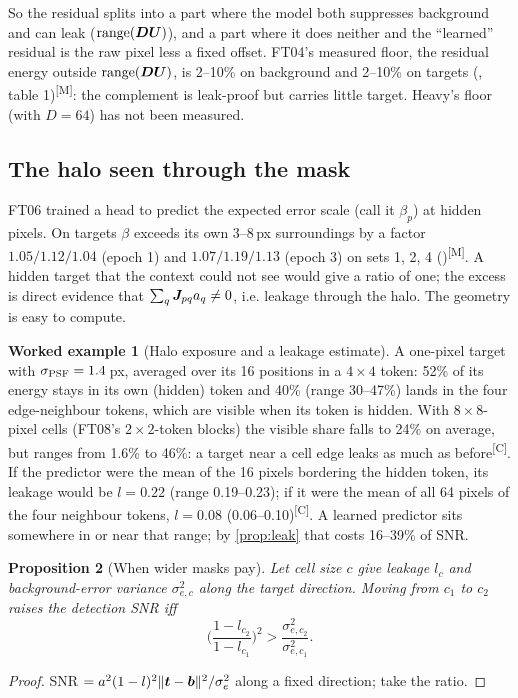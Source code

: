\documentclass[11pt,a4paper]{article}
\theoremstyle{plain}
\newtheorem{proposition}{Proposition}[section]
\theoremstyle{definition}
\newtheorem{example}[proposition]{Worked example}
\theoremstyle{remark}
\newcommand{\rng}{\operatorname{range}}
\newcommand{\bvec}{\B{b}}
\newcommand{\tv}{\B{t}}
\newcommand{\Um}{\B{U}}
\newcommand{\Dm}{\B{D}}
\newcommand{\nrm}[1]{\lVert #1\rVert}
\newcommand{\meas}{\textsuperscript{\textsf{\scriptsize[M]}}}
\newcommand{\comp}{\textsuperscript{\textsf{\scriptsize[C]}}}
\begin{document}
So the residual splits into a part where the model both suppresses background and can leak ($\rng(\Dm\Um)$), and a part
where it does neither and the ``learned'' residual is the raw pixel less a fixed offset. FT04's measured floor, the
residual energy outside $\rng(\Dm\Um)$, is 2--10\% on background and 2--10\% on targets
(, table 1)\meas: the complement is leak-proof but carries little target. Heavy's floor
(with $D=64$) has not been measured.

\subsection{The halo seen through the mask}

FT06 trained a head to predict the expected error scale (call it $\beta_p$) at hidden pixels. On targets $\beta$
exceeds its own 3--8\,px surroundings by a factor $1.05/1.12/1.04$ (epoch 1) and $1.07/1.19/1.13$ (epoch 3) on sets 1, 2, 4
()\meas. A hidden target that the context could not see would give a ratio of one; the
excess is direct evidence that $\sum_q\bm{J}_{pq}a_q\neq0$, i.e. leakage through the halo. The geometry is easy to compute.

\begin{example}[Halo exposure and a leakage estimate]
\label{ex:leak}
A one-pixel target with $\sigma_{\rm PSF}=1.4$\,px, averaged over its 16 positions in a $4\times4$ token: 52\% of its energy
stays in its own (hidden) token and 40\% (range 30--47\%) lands in the four edge-neighbour tokens, which are visible when its
token is hidden. With $8\times8$-pixel cells (FT08's $2\times2$-token blocks) the visible share falls to 24\% on average, but
ranges from 1.6\% to 46\%: a target near a cell edge leaks as much as before\comp. If the predictor were the mean of the 16
pixels bordering the hidden token, its leakage would be $l=0.22$ (range 0.19--0.23); if it were the mean of all 64 pixels of
the four neighbour tokens, $l=0.08$ (0.06--0.10)\comp. A learned predictor sits somewhere in or near that range; by
\cref{prop:leak} that costs 16--39\% of SNR.
\end{example}

\begin{proposition}[When wider masks pay]
\label{prop:wider}
Let cell size $c$ give leakage $l_c$ and background-error variance $\sigma^2_{e,c}$ along the target direction. Moving from
$c_1$ to $c_2$ raises the detection SNR iff
\[
  \Big(\frac{1-l_{c_2}}{1-l_{c_1}}\Big)^2>\frac{\sigma^2_{e,c_2}}{\sigma^2_{e,c_1}} .
\]
\end{proposition}
\begin{proof}
SNR $=a^2(1-l)^2\nrm{\tv-\bvec}^2/\sigma^2_e$ along a fixed direction; take the ratio.
\end{proof}
\end{document}

